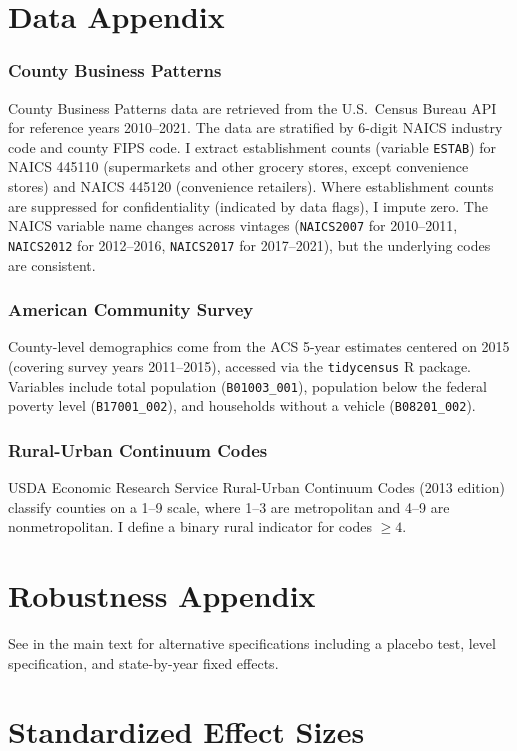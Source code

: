 \documentclass[12pt]{article}
\begin{document}
\label{apep_main_text_end}
\newpage


\newpage
\appendix

\section{Data Appendix}
\label{sec:data_appendix}

\subsubsection*{County Business Patterns} County Business Patterns data are retrieved from the U.S.\ Census Bureau API for reference years 2010--2021. The data are stratified by 6-digit NAICS industry code and county FIPS code. I extract establishment counts (variable \texttt{ESTAB}) for NAICS 445110 (supermarkets and other grocery stores, except convenience stores) and NAICS 445120 (convenience retailers). Where establishment counts are suppressed for confidentiality (indicated by data flags), I impute zero. The NAICS variable name changes across vintages (\texttt{NAICS2007} for 2010--2011, \texttt{NAICS2012} for 2012--2016, \texttt{NAICS2017} for 2017--2021), but the underlying codes are consistent.

\subsubsection*{American Community Survey} County-level demographics come from the ACS 5-year estimates centered on 2015 (covering survey years 2011--2015), accessed via the \texttt{tidycensus} R package. Variables include total population (\texttt{B01003\_001}), population below the federal poverty level (\texttt{B17001\_002}), and households without a vehicle (\texttt{B08201\_002}).

\subsubsection*{Rural-Urban Continuum Codes} USDA Economic Research Service Rural-Urban Continuum Codes (2013 edition) classify counties on a 1--9 scale, where 1--3 are metropolitan and 4--9 are nonmetropolitan. I define a binary rural indicator for codes $\geq 4$.

\section{Robustness Appendix}

See  in the main text for alternative specifications including a placebo test, level specification, and state-by-year fixed effects.

\section{Standardized Effect Sizes}
\label{sec:sde}


\end{document}
